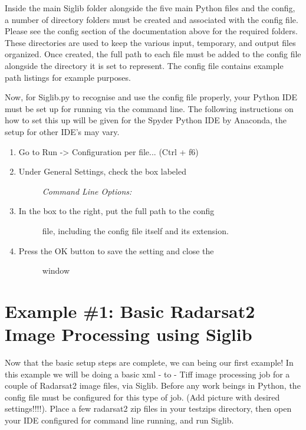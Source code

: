 \documentclass[letterpaper,10pt,openany,oneside]{sphinxmanual}
\begin{document}
Inside the main Siglib folder alongside the five main Python files and the config,
a number of directory folders must be created and associated with the
config file. Please see the config section of the documentation above for
the required folders. These directories are used to keep the various input,
temporary, and output files organized. Once created, the full path to each file
must be added to the config file alongside the directory it is set to represent.
The config file contains example path listings for example purposes.

Now, for Siglib.py to recognise and use the config file properly, your
Python IDE must be set up for running via the command line. The following
instructions on how to set this up will be given for the Spyder Python IDE
by Anaconda, the setup for other IDE's may vary.
\begin{enumerate}
\item {} 
Go to Run -\textgreater{} Configuration per file... (Ctrl + f6)

\item {} \begin{description}
\item[{Under General Settings, check the box labeled}] \leavevmode
\emph{Command Line Options:}

\end{description}

\item {} \begin{description}
\item[{In the box to the right, put the full path to the config}] \leavevmode
file, including the config file itself and its extension.

\end{description}

\item {} \begin{description}
\item[{Press the OK button to save the setting and close the}] \leavevmode
window

\end{description}

\end{enumerate}


\section{Example \#1: Basic Radarsat2 Image Processing using Siglib}
\label{tutorial:example-1-basic-radarsat2-image-processing-using-siglib}
Now that the basic setup steps are complete, we can being our first
example! In this example we will be doing a basic xml - to - Tiff
image processing job for a couple of Radarsat2 image files, via Siglib.
Before any work beings in Python, the config file must be configured for this
type of job. (Add picture with desired settings!!!!). Place a few radarsat2 zip files
in your testzips directory, then open your IDE configured for command line
running, and run Siglib.
\end{document}
